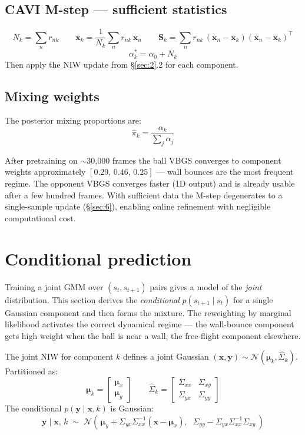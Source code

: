 \documentclass[12pt, a4paper]{article}
\newcommand{\1}{\mathbf{1}}
\newcommand{\cN}{\mathcal{N}}
\begin{document}
\subsection{CAVI M-step --- sufficient statistics}
\[
N_k = \sum_n r_{nk}
\qquad
\bar{\mathbf{x}}_k = \frac{1}{N_k}\sum_n r_{nk}\,\mathbf{x}_n
\qquad
\mathbf{S}_k = \sum_n r_{nk}\,
  (\mathbf{x}_n - \bar{\mathbf{x}}_k)(\mathbf{x}_n - \bar{\mathbf{x}}_k)^\top
\]
\[
\alpha_k^* = \alpha_0 + N_k
\]
Then apply the NIW update from \S\ref{sec:2}.2 for each component.

\subsection{Mixing weights}

The posterior mixing proportions are:
\[
\hat\pi_k = \frac{\alpha_k}{\sum_j \alpha_j}
\]

After pretraining on $\sim$30,000 frames the ball VBGS converges to component
weights approximately $[0.29,\, 0.46,\, 0.25]$ --- wall bounces are the most
frequent regime.  The opponent VBGS converges faster (1D output) and is already
usable after a few hundred frames.  With sufficient data the M-step degenerates to
a single-sample update (\S\ref{sec:6}), enabling online refinement with negligible
computational cost.

\section{Conditional prediction}
\label{sec:4}

Training a joint GMM over $(s_t, s_{t+1})$ pairs gives a model of the
\textit{joint} distribution.  This section derives the \textit{conditional}
$p(s_{t+1} \mid s_t)$ for a single Gaussian component and then forms the mixture.
The reweighting by marginal likelihood activates the correct dynamical regime ---
the wall-bounce component gets high weight when the ball is near a wall, the
free-flight component elsewhere.

The joint NIW for component $k$ defines a joint Gaussian
$(\mathbf{x}, \mathbf{y}) \sim \cN(\boldsymbol{\mu}_k, \hat\Sigma_k)$.
Partitioned as:
\[
\boldsymbol{\mu}_k = \begin{bmatrix}\boldsymbol{\mu}_x \\ \boldsymbol{\mu}_y\end{bmatrix}
\qquad
\hat\Sigma_k = \begin{bmatrix}\Sigma_{xx} & \Sigma_{xy} \\ \Sigma_{yx} & \Sigma_{yy}\end{bmatrix}
\]
The conditional $p(\mathbf{y}\mid\mathbf{x}, k)$ is Gaussian:
\[
\mathbf{y} \mid \mathbf{x},\, k \;\sim\;
\cN\!\left(\,\boldsymbol{\mu}_y + \Sigma_{yx}\Sigma_{xx}^{-1}(\mathbf{x} - \boldsymbol{\mu}_x),\;\;
\Sigma_{yy} - \Sigma_{yx}\Sigma_{xx}^{-1}\Sigma_{xy}\,\right)
\]
\end{document}
